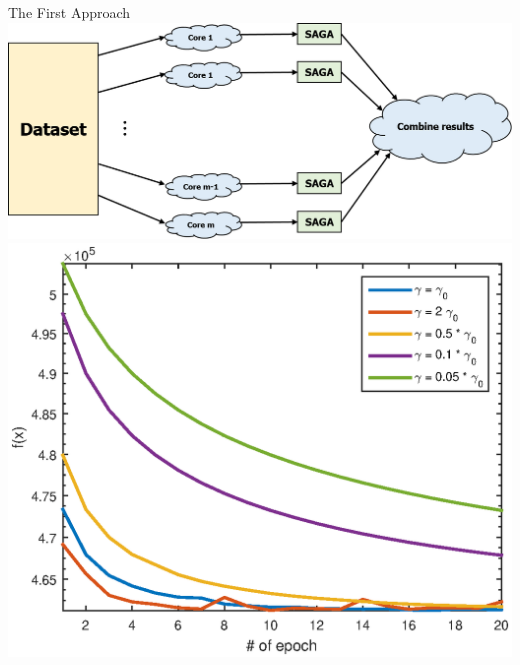 \begin{frame}{The First Approach}
	\centering
	\includegraphics[scale=0.35]{Picture1.png}
	\visible<2>
	{
		\medskip
		\medskip
		\centering
		\includegraphics[scale=0.5]{distributed1.eps} 
	}
\end{frame}

